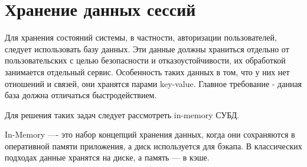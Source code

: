 %

\section{Хранение данных сессий}

Для хранения состояний системы, в частности, авторизации пользователей, следует использовать базу данных.
Эти данные должны храниться отдельно от пользовательских с целью безопасности и отказоустойчивости, их обработкой занимается отдельный сервис.
Особенность таких данных в том, что у них нет отношений и связей, они хранятся парами key-value.
Главное требование - данная база должна отличаться быстродействием.

Для решения таких задач следует рассмотреть in-memory СУБД.

In-Memory —- это набор концепций хранения данных, когда они сохраняются в оперативной памяти приложения, а диск используется для бэкапа. В классических подходах данные хранятся на диске, а память — в кэше.

